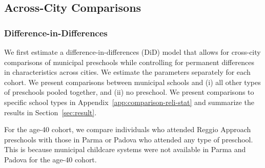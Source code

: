 

\subsection{Across-City Comparisons} \label{sec:across-city-analysis}
\subsubsection{Difference-in-Differences}  \label{subsubsection:DID}

We first estimate a difference-in-differences (DiD) model that allows for cross-city comparisons of municipal preschools while controlling for permanent differences in characteristics across cities. We estimate the parameters separately for each cohort. We present comparisons between municipal schools and (i) all other types of preschools pooled together, and (ii) no preschool. We present comparisons to specific school types in Appendix~\ref{app:comparison-reli-stat} and summarize the results in Section~\ref{sec:result}.

For the age-40 cohort, we compare individuals who attended Reggio Approach preschools with those in Parma or Padova who attended any type of preschool. This is because municipal childcare systems were not available in Parma and Padova for the age-40 cohort.


